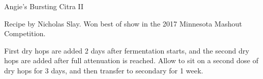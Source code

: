 \begin{recipe}{Angie's Bursting Citra II}

\begin{aboutblock}
Recipe by Nicholas Slay. Won best of show in the 2017 Minnesota Mashout Competition. 
\end{aboutblock}


\begin{methodandtiming}
 
\begin{mashsteps}
\end{mashsteps}

\begin{fermentationsteps}
\end{fermentationsteps}

\begin{directions}
First dry hops are added 2 days after fermentation starts, and the
second dry hops are added after full attenuation is reached. Allow
to sit on a second dose of dry hops for 3 days, and then transfer to
secondary for 1 week.
\end{directions}

\end{methodandtiming}

\recipebreak

\begin{ingredientsblock}

\begin{malts}
\end{malts}

\begin{hops}
\end{hops}


\end{ingredientsblock}

\end{recipe}

